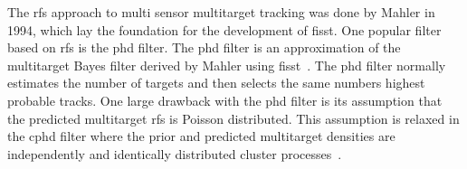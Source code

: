 The \gls{rfs} approach to multi sensor multitarget tracking was done by Mahler in 1994, which lay the foundation for the development of \gls{fisst}. One popular filter based on \gls{rfs} is the \gls{phd} filter. The \gls{phd} filter is an approximation of the multitarget Bayes filter derived by Mahler using \gls{fisst}~\cite{Vo2015}. The \gls{phd} filter normally estimates the number of targets and then selects the same numbers highest probable tracks. One large drawback with the \gls{phd} filter is its assumption that the predicted multitarget \gls{rfs} is Poisson distributed. This assumption is relaxed in the \gls{cphd} filter where the prior and predicted multitarget densities are independently and identically distributed cluster processes~\cite{Mahler2007}.

